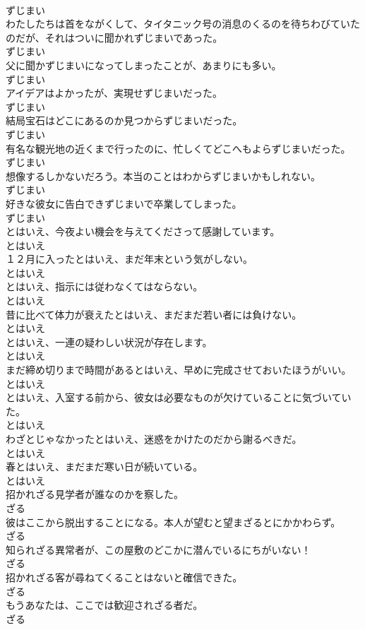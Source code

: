 \documentclass[8pt]{extreport}
\begin{document}
\begin{CJK}{UTF8}{min}
\\	ずじまい
\\	わたしたちは首をながくして、タイタニック号の消息のくるのを待ちわびていたのだが、それはついに聞かれずじまいであった。	
\\	ずじまい
\\	父に聞かずじまいになってしまったことが、あまりにも多い。	
\\	ずじまい
\\	アイデアはよかったが、実現せずじまいだった。	
\\	ずじまい
\\	結局宝石はどこにあるのか見つからずじまいだった。	
\\	ずじまい
\\	有名な観光地の近くまで行ったのに、忙しくてどこへもよらずじまいだった。	
\\	ずじまい
\\	想像するしかないだろう。本当のことはわからずじまいかもしれない。	
\\	ずじまい
\\	好きな彼女に告白できずじまいで卒業してしまった。	
\\	ずじまい
\\	とはいえ、今夜よい機会を与えてくださって感謝しています。	
\\	とはいえ
\\	１２月に入ったとはいえ、まだ年末という気がしない。	
\\	とはいえ
\\	とはいえ、指示には従わなくてはならない。	
\\	とはいえ
\\	昔に比べて体力が衰えたとはいえ、まだまだ若い者には負けない。	
\\	とはいえ
\\	とはいえ、一連の疑わしい状況が存在します。	
\\	とはいえ
\\	まだ締め切りまで時間があるとはいえ、早めに完成させておいたほうがいい。	
\\	とはいえ
\\	とはいえ、入室する前から、彼女は必要なものが欠けていることに気づいていた。	
\\	とはいえ
\\	わざとじゃなかったとはいえ、迷惑をかけたのだから謝るべきだ。	
\\	とはいえ
\\	春とはいえ、まだまだ寒い日が続いている。	
\\	とはいえ
\\	招かれざる見学者が誰なのかを察した。	
\\	ざる
\\	彼はここから脱出することになる。本人が望むと望まざるとにかかわらず。	
\\	ざる
\\	知られざる異常者が、この屋敷のどこかに潜んでいるにちがいない！	
\\	ざる
\\	招かれざる客が尋ねてくることはないと確信できた。	
\\	ざる
\\	もうあなたは、ここでは歓迎されざる者だ。	
\\	ざる
\end{CJK}
\end{document}
